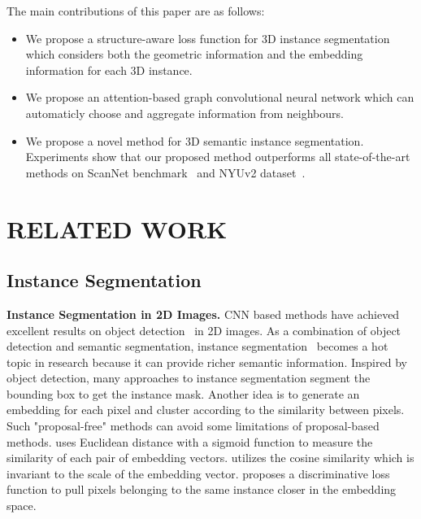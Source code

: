 \documentclass{article}
\begin{document}
The main contributions of this paper are as follows:

\begin{itemize}
	
	\item We propose a structure-aware loss function for 3D instance segmentation which considers both the geometric information and the embedding information for each 3D instance.
	
	\item We propose an attention-based graph convolutional neural network which can automaticly choose and aggregate information from neighbours.
	
	\item We propose a novel method for 3D semantic instance segmentation. Experiments show that our proposed method outperforms all state-of-the-art methods on ScanNet benchmark~\cite{dai2017scannet} and NYUv2 dataset~\cite{silberman2012indoor}.
	
	
\end{itemize}

\section{RELATED WORK}

\subsection{Instance Segmentation}
\textbf{Instance Segmentation in 2D Images. }CNN based methods have achieved excellent results on object detection~\cite{girshick2015fast,ren2015faster,redmon2016you,liu2016ssd,lin2017feature,lin2018focal} in 2D images. As a combination of object detection and semantic segmentation, instance segmentation~\cite{he2017mask,fathi2017semantic,kong2018recurrent,de2017semantic} becomes a hot topic in research because it can provide richer semantic information. Inspired by object detection, many approaches to instance segmentation segment the bounding box to get the instance mask. Another idea is to generate an embedding for each pixel and cluster according to the similarity between pixels. Such "proposal-free" methods can avoid some limitations of proposal-based methods. \cite{fathi2017semantic} uses Euclidean distance with a sigmoid function to measure the similarity of each pair of embedding vectors. \cite{kong2018recurrent} utilizes the cosine similarity which is invariant to the scale of the embedding vector. \cite{de2017semantic} proposes a discriminative loss function to pull pixels belonging to the same instance closer in the embedding space.
\end{document}
